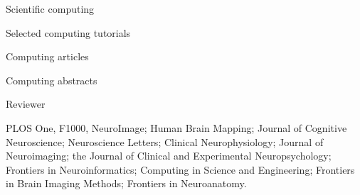\documentclass{cv}
\begin{document}
\begin{cvSection}{Scientific computing}
\begin{cvSubSection}{Selected computing tutorials}

\printbibliography[heading=none,
    keyword=computing,
    keyword=online,
notkeyword=omit]

\end{cvSubSection}

\begin{cvSubSection}{Computing articles}

\printbibliography[heading=none,
    keyword=computing,
    keyword=article,
notkeyword=omit]

\end{cvSubSection}

\begin{cvSubSection}{Computing abstracts}

\printbibliography[heading=none,
    keyword=computing,
    keyword=abstract,
notkeyword=omit]

\end{cvSubSection}

\end{cvSection}

\begin{cvSection}{Reviewer}

    PLOS One, F1000, NeuroImage; Human Brain Mapping; Journal of Cognitive
    Neuroscience; Neuroscience Letters; Clinical Neurophysiology; Journal of
    Neuroimaging; the Journal of Clinical and Experimental Neuropsychology;
    Frontiers in Neuroinformatics; Computing in Science and Engineering;
    Frontiers in Brain Imaging Methods; Frontiers in Neuroanatomy.

\end{cvSection}
\end{document}
